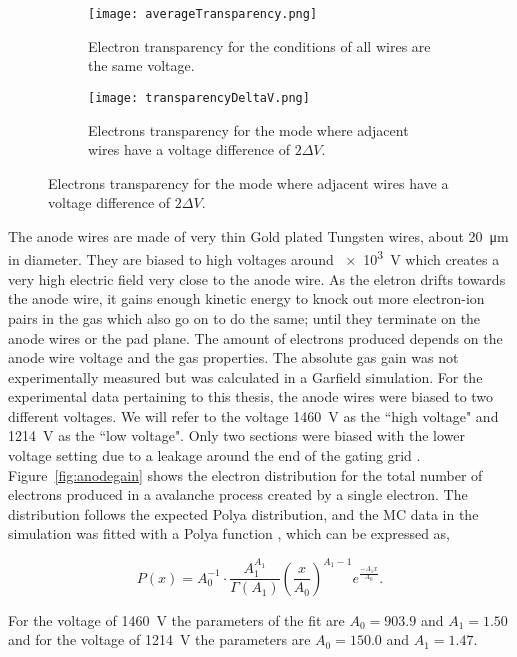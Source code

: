 \begin{figure}[!htb]
    \centering
    \begin{subfigure}[t]{0.49\textwidth}
        \centering
        \texttt{[image: averageTransparency.png]} 
        \caption{Electron transparency for the conditions of all wires are the same voltage.} \label{fig:ggAvgTrans}
    \end{subfigure}
    \hfill
    \begin{subfigure}[t]{0.49\textwidth}
        \centering
        \texttt{[image: transparencyDeltaV.png]} 
        \caption{Electrons transparency for the mode where adjacent wires have a voltage difference of $2 \Delta V$.} \label{fig:ggDeltaVTrans}
    \end{subfigure}
\label{fig:ggTrans}
\end{figure}



The anode wires are made of very thin Gold plated Tungsten wires, about \SI{20}{\micro\metre} in diameter. They are biased to high voltages around \SI{e3}{\volt} which creates a very high electric field very close to the anode wire. As the eletron drifts towards the anode wire, it gains enough kinetic energy to knock out more electron-ion pairs in the gas which also go on to do the same; until they terminate on the anode wires or the pad plane. The amount of electrons produced depends on the anode wire voltage and the gas properties. The absolute gas gain was not experimentally measured but was calculated in a Garfield simulation. For the experimental data pertaining to this thesis, the anode wires were biased to two different voltages. We will refer to the voltage \SI{1460}{\volt} as the ``high voltage" and \SI{1214}{\volt} as the ``low voltage". Only two sections were biased with the lower voltage setting due to a leakage around the end of the gating grid \cite{jon}. Figure~\ref{fig:anodegain} shows the electron distribution for the total number of electrons produced in a avalanche process created by a single electron. The distribution follows the expected Polya distribution, and the MC data in the simulation was fitted with a Polya function \cite{blumrol}, which can be expressed as,

\begin{equation}
P(x) = A_0^{-1}\cdot \frac{A_1^{A_1}}{\Gamma(A_1)} \left(\frac{x}{A_0}\right)^{A_1-1}e^{\frac{-A_1x}{A_0}}.
\end{equation}

For the voltage of \SI{1460}{\volt} the parameters of the fit are $A_0=903.9$ and $A_1=1.50$ and for the voltage of \SI{1214}{\volt} the parameters are $A_0=150.0$ and $A_1=1.47$. 



